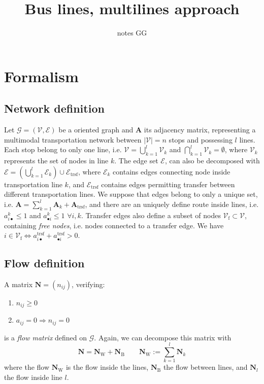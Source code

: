 \documentclass[11p]{article}
\title{Bus lines, multilines approach}
\author{notes GG}
\begin{document}
\maketitle

\section{Formalism}

\subsection{Network definition}

Let $\mathcal{G} = (\mathcal{V}, \mathcal{E})$ be a oriented graph and $\mathbf{A}$ its adjacency matrix, representing a multimodal transportation network between $|\mathcal{V}| = n$ stops and possessing $l$ lines. Each stop belong to only one line, i.e. $\mathcal{V} = \bigcup_{k=1}^l \mathcal{V}_k$ and $\bigcap_{k=1}^l \mathcal{V}_k = \emptyset$, where $\mathcal{V}_k$ represents the set of nodes in line $k$. The edge set $\mathcal{E}$, can also be decomposed with $\mathcal{E} = \left(\bigcup_{k=1}^l \mathcal{E}_k\right) \cup \mathcal{E}_\text{trsf}$, where $\mathcal{E}_k$ contains edges connecting node inside transportation line $k$, and $\mathcal{E}_\text{trsf}$ contains edges permitting transfer between different transportation lines. We suppose that edges belong to only a unique set, i.e. $\mathbf{A} = \sum_{k=1}^l \mathbf{A}_k + \mathbf{A}_\text{trsf}$, and there are an uniquely define route inside lines, i.e. $a^k_{i \bullet} \leq 1$ and $a^k_{\bullet i} \leq 1$ $\forall i,k$. Transfer edges also define a subset of nodes $\mathcal{V}_\text{f} \subset \mathcal{V}$, containing \emph{free nodes}, i.e. nodes connected to a transfer edge. We have $i \in \mathcal{V}_\text{f} \iff a^\text{trsf}_{i \bullet} + a^\text{trsf}_{\bullet i} > 0$.

\subsection{Flow definition}


A matrix $\mathbf{N} = (n_{ij})$, verifying:
\begin{enumerate}
	\item $n_{ij} \geq 0$
	\item $a_{ij} = 0 \Rightarrow n_{ij} = 0$
\end{enumerate}
is a \emph{flow matrix} defined on $\mathcal{G}$. Again, we can decompose this matrix with 
\begin{equation}
\mathbf{N} = \mathbf{N}_\text{W} + \mathbf{N}_\text{B} \qquad \mathbf{N}_\text{W} := \sum_{k=1}^l \mathbf{N}_k
\end{equation}
where the flow $\mathbf{N}_\text{W}$ is the flow inside the lines, $\mathbf{N}_\text{B}$ the flow between lines, and $\mathbf{N}_l$ the flow inside line $l$.
\end{document}
